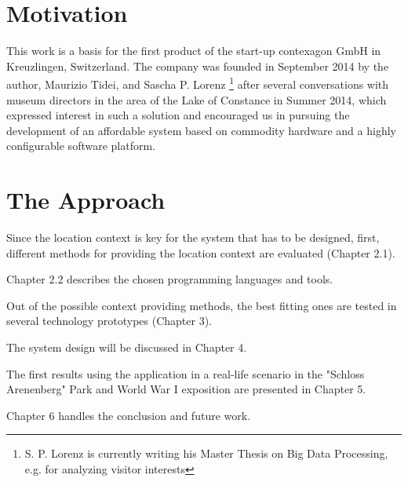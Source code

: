 \section{Motivation}

This work is a basis for the first product of the start-up contexagon GmbH in Kreuzlingen, Switzerland. The company was founded in September 2014 by the author, Maurizio Tidei, and Sascha P. Lorenz \footnote{S. P. Lorenz is currently writing his Master Thesis on Big Data Processing, e.g. for analyzing visitor interests} after several conversations with museum directors in the area of the Lake of Constance in Summer 2014, which expressed interest in such a solution and encouraged us in pursuing the development of an affordable system based on commodity hardware and a highly configurable software platform.

\section{The Approach}

Since the location context is key for the system that has to be designed, first, different methods for providing the location context are evaluated (Chapter 2.1). 

Chapter 2.2 describes the chosen programming languages and tools.

Out of the possible context providing methods, the best fitting ones are tested in several technology prototypes (Chapter 3).

The system design will be discussed in Chapter 4.

The first results using the application in a real-life scenario in the "Schloss Arenenberg" Park and World War I exposition are presented in Chapter 5.

Chapter 6 handles the conclusion and future work. 